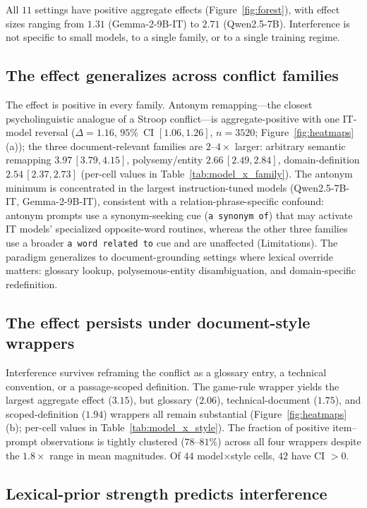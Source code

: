 \documentclass[11pt]{article}
\newcommand{\effect}{\ensuremath{\Delta}\xspace}
\begin{document}
All $11$ settings have positive aggregate effects (Figure~\ref{fig:forest}), with effect sizes
ranging from $1.31$ (Gemma-2-9B-IT) to $2.71$ (Qwen2.5-7B). Interference is not specific to
small models, to a single family, or to a single training regime.

\subsection{The effect generalizes across conflict families}

The effect is positive in every family. Antonym remapping---the closest psycholinguistic
analogue of a Stroop conflict---is aggregate-positive with one IT-model reversal
($\effect = 1.16$, $95\%$~CI $[1.06, 1.26]$, $n{=}3520$; Figure~\ref{fig:heatmaps}(a)); the
three document-relevant families are $2$--$4\times$ larger: arbitrary semantic remapping
$3.97$\,$[3.79, 4.15]$, polysemy/entity $2.66$\,$[2.49, 2.84]$, domain-definition
$2.54$\,$[2.37, 2.73]$ (per-cell values in Table~\ref{tab:model_x_family}). The antonym
minimum is concentrated in the largest instruction-tuned models (Qwen2.5-7B-IT, Gemma-2-9B-IT),
consistent with a relation-phrase-specific confound: antonym prompts use a synonym-seeking cue
(\texttt{a synonym of}) that may activate IT models' specialized opposite-word routines,
whereas the other three families use a broader \texttt{a word related to} cue and are
unaffected (Limitations). The paradigm generalizes to document-grounding settings where lexical override matters:
glossary lookup, polysemous-entity disambiguation, and domain-specific redefinition.

\subsection{The effect persists under document-style wrappers}

Interference survives reframing the conflict as a glossary entry, a technical convention, or a
passage-scoped definition. The game-rule wrapper yields the largest aggregate effect ($3.15$),
but glossary ($2.06$), technical-document ($1.75$), and scoped-definition ($1.94$) wrappers all
remain substantial (Figure~\ref{fig:heatmaps}(b); per-cell values in
Table~\ref{tab:model_x_style}). The fraction of positive item--prompt observations is tightly
clustered ($78$--$81\%$) across all four wrappers despite the $1.8\times$ range in mean
magnitudes. Of $44$ model$\times$style cells, $42$ have CI $> 0$.

\subsection{Lexical-prior strength predicts interference}
\label{sec:lexical_predictor}
\end{document}
